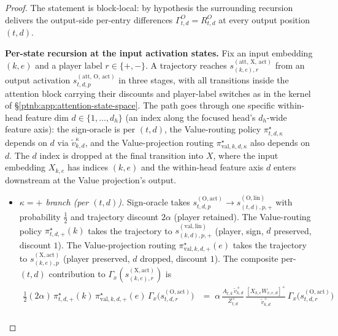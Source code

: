 \begin{proof}
The statement is block-local: by hypothesis the surrounding recursion delivers the output-side
per-entry differences $\Gamma^{O}_{t,d} = R^{O}_{t,d}$ at every output position $(t,d)$.

\textbf{Per-state recursion at the input activation states.} Fix an input embedding $(k,e)$ and a
player label $r \in \{+,-\}$. A trajectory reaches
$s_{(k,e),r}^{(\mathrm{att},\,\mathrm{X},\,\mathrm{act})}$ from an output activation
$s_{t,d,p}^{(\mathrm{att},\,\mathrm{O},\,\mathrm{act})}$ in three stages, with all transitions
inside the attention block carrying their discounts and player-label switches as in the kernel of
\S\ref{ptnb:app:attention-state-space}. The path goes through one specific within-head feature dim $d
    \in \{1,\dots,d_h\}$ (an index along the focused head's $d_h$-wide feature axis): the sign-oracle
is per $(t,d)$, the Value-routing policy $\pi_{t,d,\kappa}^\star$ depends on $d$ via
$\tilde{v}_{k,d}^\kappa$, and the Value-projection routing $\pi_{\mathrm{val},k,d,\kappa}^\star$
also depends on $d$. The $d$ index is dropped at the final transition into $X$, where the input
embedding $X_{k,e}$ has indices $(k,e)$ and the within-head feature axis $d$ enters downstream at
the Value projection's output.
\begin{itemize}
    \item \emph{$\kappa = +$ branch (per $(t,d)$).} Sign-oracle takes $s_{t,d,p}^{(\mathrm{O},\mathrm{act})}
            \to s_{(t,d),p,+}^{(\mathrm{O},\mathrm{lin})}$ with probability $\tfrac12$ and trajectory discount
        $2\alpha$ (player retained). The Value-routing policy $\pi_{t,d,+}^\star(k)$ takes the trajectory
        to $s_{(k,d),p,+}^{(\mathrm{val},\mathrm{lin})}$ (player, sign, $d$ preserved, discount $1$). The
        Value-projection routing $\pi_{\mathrm{val},k,d,+}^\star(e)$ takes the trajectory to
        $s_{(k,e),p}^{(\mathrm{X},\mathrm{act})}$ (player preserved, $d$ dropped, discount $1$). The
        composite per-$(t,d)$ contribution to $\Gamma_x(s_{(k,e),r}^{(\mathrm{X},\mathrm{act})})$ is
        \begin{align}
            \tfrac12 (2\alpha)\, \pi_{t,d,+}^\star(k)\, \pi_{\mathrm{val},k,d,+}^\star(e)\,
            \Gamma_x\!\bigl(s_{t,d,r}^{(\mathrm{O},\mathrm{act})}\bigr)
            &=\; \alpha\, \frac{A_{t,k}\, \tilde{v}_{k,d}^+}{Z_{t,d}^+}\,\frac{[X_{k,e}
            W_{v,e,d}]^+}{\tilde{v}_{k,d}^+}\, \Gamma_x\!\bigl(s_{t,d,r}^{(\mathrm{O},\mathrm{act})}\bigr) \\

\end{align}
\end{itemize}
\end{proof}
